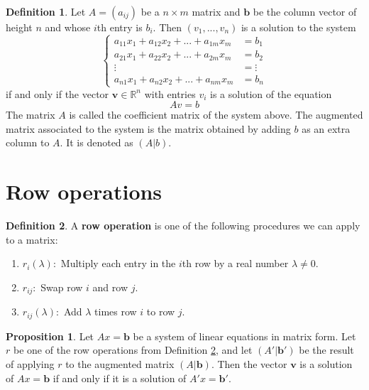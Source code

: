 \documentclass[11pt,a4paper]{article}
\newcommand\R{\mathbb{R}}
\theoremstyle{definition}
\newtheorem{definition}{Definition}
\newtheorem{proposition}{Proposition}
\begin{document}
\begin{definition}
    Let $ A = (a_{ij}) $ be a $ n \times m $ matrix and $\mathbf{b}$ be the column vector of height $ n $ and whose $i$th entry is $ b_i $. 
    Then $(v_1, ..., v_n)$ is a solution to the system
    \[
    \begin{cases}
        a_{11}x_1 + a_{12}x_2 + ... + a_{1m}x_m &= b_1 \\
        a_{21}x_1 + a_{22}x_2 + ... + a_{2m}x_m &= b_2 \\
        \vdots                                  &= \vdots \\
        a_{n1}x_1 + a_{n2}x_2 + ... + a_{nm}x_m &= b_n 
    \end{cases}
    \]
    if and only if the vector $\mathbf{v} \in \R^n $ with entries $ v_i $ is a solution of the equation
    \[ Av = b\]
    The matrix $ A $ is called the coefficient matrix of the system above. The augmented matrix associated to the system is the matrix obtained by adding $b$ as an extra column to $ A $.
    It is denoted as $ (A|b) $.
\end{definition}

\section{Row operations} 
\begin{definition}
    A \textbf{row operation} is one of the following procedures we can apply to a matrix:
    \begin{enumerate}
        \item $ r_i(\lambda) :$ Multiply each entry in the $i$th row by a real number $ \lambda \neq 0 $.
        \item $ r_{ij} :$ Swap row $i$ and row $j$. 
        \item $ r_{ij}(\lambda) :$ Add $\lambda$ times row $i$ to row $j$. 
    \end{enumerate}
    \label{rowOps}
\end{definition}

\begin{proposition}
    Let $Ax = \mathbf{b} $ be a system of linear equations in matrix form. Let $ r $ be one of the row operations from Definition \ref{rowOps}, 
    and let $(A'| \mathbf{b}')$ be the result of applying $r$ to the augmented matrix $(A| \mathbf{b})$. Then the vector $\mathbf{v}$ is a solution of 
    $Ax = \mathbf{b} $ if and only if it is a solution of $A'x = \mathbf{b}' $.
\end{proposition}
\end{document}
